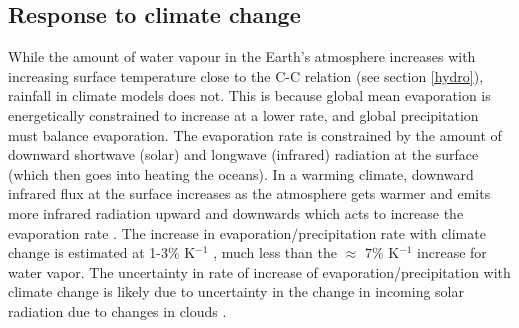 \documentclass[letterpaper,12pt,titlepage,oneside,final]{book}
\begin{document}
\subsection{Response to climate change}\label{response}

While the amount of water vapour in the Earth's atmosphere increases with increasing surface temperature close to the C-C relation (see section \ref{hydro}), rainfall in climate models does not. This is because global mean evaporation is energetically constrained to increase at a lower rate, and global precipitation must balance evaporation. The evaporation rate is constrained by the amount of downward shortwave (solar) and longwave (infrared) radiation at the surface (which then goes into heating the oceans). In a warming climate, downward infrared flux at the surface increases as the atmosphere gets warmer and emits more infrared radiation upward and downwards which acts to increase the evaporation rate \citep{boer_climate_1993}. The increase in evaporation/precipitation rate with climate change is estimated at 1-3$\%$ K$^{-1}$ \citep{schneider_water_2010,he_anthropogenic_2015,boer_climate_1993}, much less than the $\approx$ $7 \%$ K$^{-1}$ increase for water vapor.  The uncertainty in rate of increase of evaporation/precipitation with climate change is likely due to uncertainty in the change in incoming solar radiation due to changes in clouds \citep{allen_constraints_2002}.
\end{document}
